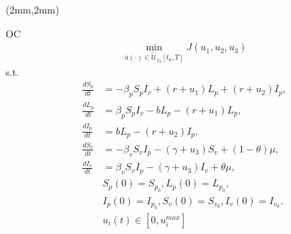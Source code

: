 	\begin{frame}[plain]
		\begin{textblock*}{120mm}(2mm,2mm)
			\begin{yellowbox}{OC}
				\begin{align*}
				\min_{\bar{u}(\cdot)\in \tilde{\mathcal{U}}_{x_0}[t_0,T]}J(u_1,u_2,u_3)
				\end{align*}
				s.t.
				\begin{equation*}
					\begin{aligned}
						\frac{dS_p}{dt} &=
						 -\beta_p S_p I_v +(r +u_1)L_p + (r + u_2) I_p,
						 \\
						\frac{dL_p}{dt} &=
						\beta_p S_p I_v -b L_p -(r + u_1)L_p,
						\\
						\frac{dI_p}{dt} &= 
						b L_p - (r + u_2) I_p,
						\\
						\frac{dS_v}{dt} &=
						-\beta_v S_v I_p - (\gamma+u_3) S_v +(1-\theta)\mu,
						\\
						\frac{dI_v}{dt} &=
						\beta_v S_v I_p -(\gamma+u_3) I_v +\theta\mu,
						\\
						&S_p(0) = S_{p_0}, L_p(0) = L_{p_0},
						\\
						&I_p(0) = I_{p_0},S_v(0) = S_{v_0}, I_v(0) = I_{v_0}.
						\\
						&u_i(t)\in[0,u_i^{max}]
						\end{aligned}%
				\end{equation*}
			\end{yellowbox}
		\end{textblock*}
	\end{frame}
